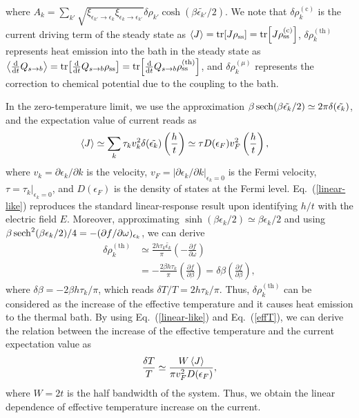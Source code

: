 \documentclass[a4paper, amsfonts, amssymb, amsmath, reprint, showkeys, nofootinbib, twoside,superscriptaddress, prb]{revtex4-2}
\newcommand{\mr}[1]{\mathrm{#1}}
\newcommand{\epk}{\epsilon_k}
\newcommand{\epkp}{\epsilon_{k'}}
\newcommand{\p}{\partial}
\newcommand{\dt}{\frac{\mathrm{d}}{\mathrm{d}t}}
\begin{document}
where $A_k = \sum_{k'}\sqrt{\xi_{\epkp\rightarrow\epk}\xi_{\epk\rightarrow\epkp}}\delta\rho_{k'}\cosh(\beta\tilde{\epkp}/2)$.
We note that $\delta\rho_k^{(\mr{c})}$ is the current driving term of the steady state as $\ev{J} = \tr[J\rho_{\mr{ss}}] = \tr[J\rho^{(\mr{c})}_{\mr{ss}}]$, $\delta\rho_k^{(\mr{th})}$ represents heat emission into the bath in the steady state as $\ev{\dt Q_{s\rightarrow b}} = \tr[\dt Q_{s\rightarrow b}\rho_{\mr{ss}}] = \tr[\dt Q_{s\rightarrow b}\rho^{(\mr{th})}_{\mr{ss}}]$, and $\delta\rho_k^{(\mu)}$ represents the correction to chemical potential due to the coupling to the bath. 

In the zero-temperature limit, we use the approximation $\beta\sech(\beta\tilde{\epk}/2)\simeq 2\pi \delta(\tilde{\epk})$, and the expectation value of current reads as
\begin{align}
    \ev{J} &\simeq \sum_k \tau_k v_k^2\delta(\tilde{\epk}) \left(\frac{h}{t}\right)\simeq \tau D(\epsilon_F) v^2_F \left(\frac{h}{t}\right),\label{linear-like}%
\end{align}
where $v_k = \p\epk/\p k$ is the velocity, $v_F = |\p\epk/\p k|_{\epk=0}$ is the Fermi velocity, $\tau = \tau_k|_{\epk=0}$, and $D(\epsilon_F)$ is the density of states at the Fermi level. 
Eq.~(\ref{linear-like}) reproduces the standard linear-response result upon identifying $h/t$ with the electric field $E$.
Moreover, approximating $\sinh(\beta\epk/2)\simeq \beta\epk/2$ and using $\beta\sech^2(\beta\epk/2)/4=-(\p f/\p\omega)_{\epk}$, we can derive
\begin{align}
    \delta\rho^{(\mr{th})}_k&\simeq \frac{2h\tau_k \tilde{\epk}}{\pi} \left(-\frac{\p f}{\p\omega}\right) \\
    &= -\frac{2\beta h\tau_k}{\pi} \left(\frac{\p f}{\p\beta}\right) = \delta\beta\left(\frac{\p f}{\p\beta}\right),\label{effT}
\end{align}
where $\delta\beta = -2\beta h \tau_k/\pi$, which reads $\delta T/T = 2 h\tau_k/\pi$. Thus, $\delta\rho_k^{(\mr{th})}$ can be considered as the increase of the effective temperature and it causes heat emission to the thermal bath. By using Eq.~(\ref{linear-like}) and Eq.~(\ref{effT}), we can derive the relation between the increase of the effective temperature and the current expectation value as
\begin{align}
    \frac{\delta T}{T} \simeq \frac{ W\ev{J}}{\pi v_F^2D(\epsilon_F)},\label{T-Jrelation}
\end{align}
where $W = 2t$ is the half bandwidth of the system.
Thus, we obtain the linear dependence of effective temperature increase on the current.
\end{document}
